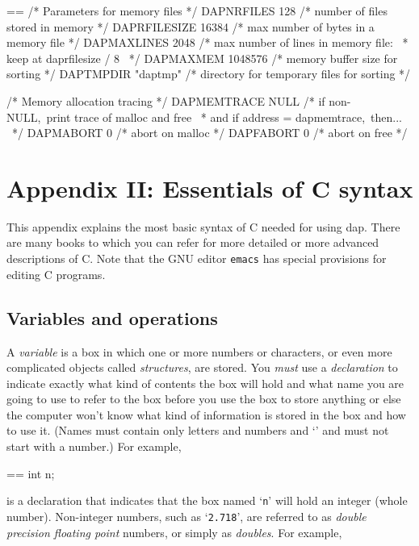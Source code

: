 \documentclass{book}
\makeatletter
\newenvironment{Texinfopreformatted}{%
  \par\GNUTobeylines\obeyspaces\frenchspacing\parskip=\z@\parindent=\z@}{}
{\catcode`\^^M=13 \gdef\GNUTobeylines{\catcode`\^^M=13 \def^^M{\null\par}}}
\newenvironment{Texinfoindented}{\begin{list}{}{}\item\relax}{\end{list}}
\renewcommand{\_}{\Texinfounderscore\discretionary{}{}{}}
\makeatother
\begin{document}
\begin{Texinfoindented}
\begin{Texinfopreformatted}
/* Parameters for memory files */
DAP\_NRFILES 128  /* number of files stored in memory */
DAP\_RFILESIZE 16384  /* max number of bytes in a memory file */
DAP\_MAXLINES 2048  /* max number of lines in memory file:
\                    * keep at dap\_rfilesize / 8
\                    */
DAP\_MAXMEM 1048576 /* memory buffer size for sorting */
DAP\_TMPDIR "dap\_tmp" /* directory for temporary files for sorting */

/* Memory allocation tracing */
DAP\_MEMTRACE NULL  /* if non-NULL,\ print trace of malloc and free
\                    * and if address = dap\_memtrace,\ then...
\                    */
DAP\_MABORT 0  /* abort on malloc */
DAP\_FABORT 0  /* abort on free */
\end{Texinfopreformatted}
\end{Texinfoindented}

\chapter*{{Appendix II: Essentials of C syntax}}
\label{anchor:Appendix-II}%

This appendix explains the most basic syntax of C needed for using dap.
There are many books to which you can refer for more detailed or
more advanced descriptions of C.
Note that the GNU editor \texttt{emacs} has special provisions for editing
C programs.


\section{{Variables and operations}}
\label{anchor:Variables-and-operations}%

A \textsl{variable} is a box in which one or more numbers or characters,
or even more complicated objects called \textsl{structures}, are stored.
You \emph{must} use a \textsl{declaration}
%
%
%
%
to indicate exactly what kind of contents the box will hold and what
name you are going to use to refer to the box before you
use the box to store anything or else the computer won't know
what kind of information is stored in the box and how to use it.
(Names must contain only letters and numbers and `\texttt{\_}' and
must not start with a number.)
For example,

\begin{Texinfoindented}
\begin{Texinfopreformatted}%
\ttfamily int n;
\end{Texinfopreformatted}
\end{Texinfoindented}
\noindent{}is a declaration that
indicates that the box named `\texttt{n}' will hold an integer
%
(whole number).
Non-integer numbers, such as `\texttt{2.718}', are referred to as
\textsl{double precision floating point} numbers, or simply as
\textsl{doubles}.
%
For example,
\end{document}

